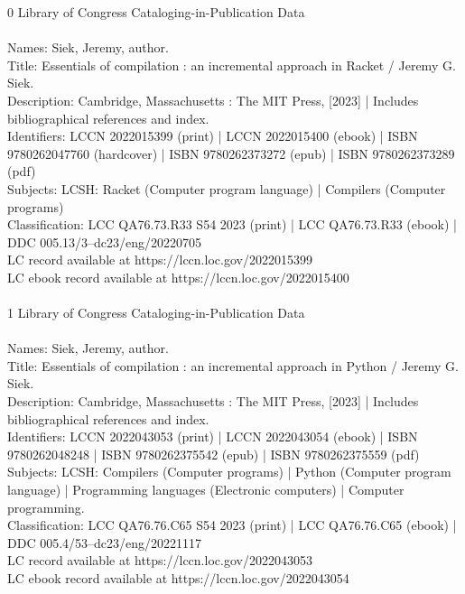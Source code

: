 \documentclass[7x10]{TimesAPriori_MIT}%
\def\racketEd{0}
\def\pythonEd{1}
\providecommand{\BookEdition}{1}
\let\edition\BookEdition
\numberwithin{theorem}{chapter}
\numberwithin{definition}{chapter}
\numberwithin{equation}{chapter}
\begin{document}
\begin{copyrightpage}
{\if\edition\racketEd
Library of Congress Cataloging-in-Publication Data\\
\ \\
Names: Siek, Jeremy, author.  \\
Title: Essentials of compilation : an incremental approach in Racket / Jeremy G. Siek.  \\
Description: Cambridge, Massachusetts : The MIT Press, [2023] | Includes bibliographical references and index. \\
Identifiers: LCCN 2022015399 (print) | LCCN 2022015400 (ebook) | ISBN 9780262047760 (hardcover) | ISBN 9780262373272 (epub) | ISBN 9780262373289 (pdf)  \\
Subjects: LCSH: Racket (Computer program language) | Compilers (Computer programs) \\
Classification: LCC QA76.73.R33 S54 2023  (print) | LCC QA76.73.R33 (ebook) | DDC 005.13/3--dc23/eng/20220705 \\
LC record available at https://lccn.loc.gov/2022015399\\
LC ebook record available at https://lccn.loc.gov/2022015400\\
\ \\
\fi}
%
{\if\edition\pythonEd
Library of Congress Cataloging-in-Publication Data\\
\ \\
Names: Siek, Jeremy, author.  \\
Title: Essentials of compilation : an incremental approach in Python / Jeremy G. Siek.  \\
Description: Cambridge, Massachusetts : The MIT Press, [2023] | Includes 
   bibliographical references and index. \\
Identifiers: LCCN 2022043053 (print) | LCCN 2022043054 (ebook) | ISBN 
   9780262048248 | ISBN 9780262375542 (epub) | ISBN 9780262375559 (pdf)  \\
Subjects: LCSH: Compilers (Computer programs) | Python (Computer program 
   language) | Programming languages (Electronic computers) | Computer 
   programming. \\
Classification: LCC QA76.76.C65 S54 2023  (print) | LCC QA76.76.C65  
   (ebook) | DDC 005.4/53--dc23/eng/20221117 \\
LC record available at https://lccn.loc.gov/2022043053\\
LC ebook record available at https://lccn.loc.gov/2022043054  \\
\ \\
\fi}


\end{copyrightpage}
\end{document}
